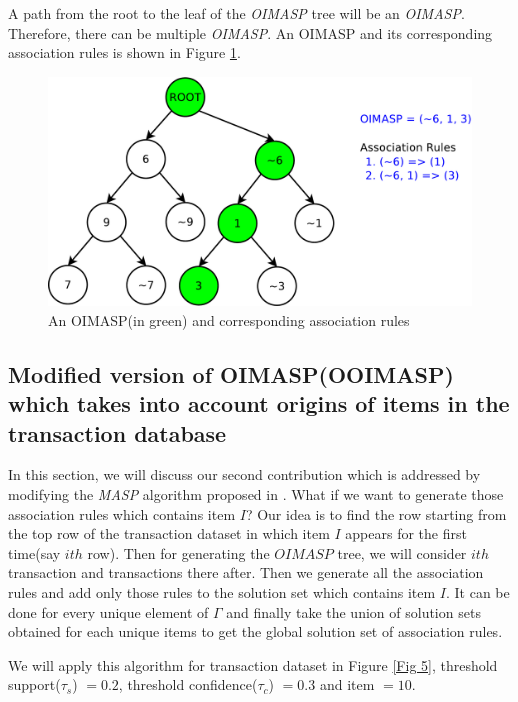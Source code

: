 \documentclass[3p, twocolumn]{elsarticle}
\begin{document}
A path from the root to the leaf of the \emph{OIMASP} tree will be an \emph{OIMASP}. Therefore, there can be multiple \emph{OIMASP}. An OIMASP and its corresponding association rules is shown in Figure \ref{Fig 7}.

\begin{figure}
\begin{center}
\includegraphics[scale=0.35]{pdf/oimasp}
\end{center}
\caption{An OIMASP(in green) and corresponding association rules}
\label{Fig 7}
\end{figure}

\subsection{Modified version of OIMASP(OOIMASP) which takes into account origins of items in the transaction database}
In this section, we will discuss our second contribution which is addressed by modifying the \emph{MASP} algorithm proposed in \cite{oldmasp}. What if we want to generate those association rules which contains item $ I $? Our idea is to find the row starting from the top row of the transaction dataset in which item $ I $ appears for the first time(say $ ith $ row). Then for generating the $ OIMASP $ tree, we will consider $ ith $ transaction and transactions there after. Then we generate all the association rules and add only those rules to the solution set which contains item $ I $. It can be done for every unique element of $ \Gamma $ and finally take the union of solution sets obtained for each unique items to get the global solution set of association rules.

We will apply this algorithm for transaction dataset in Figure \ref{Fig 5}, threshold support($ \tau _{s} $) $ = 0.2 $, threshold confidence($ \tau _{c} $) $ = 0.3 $ and item $ = 10 $.
\end{document}
